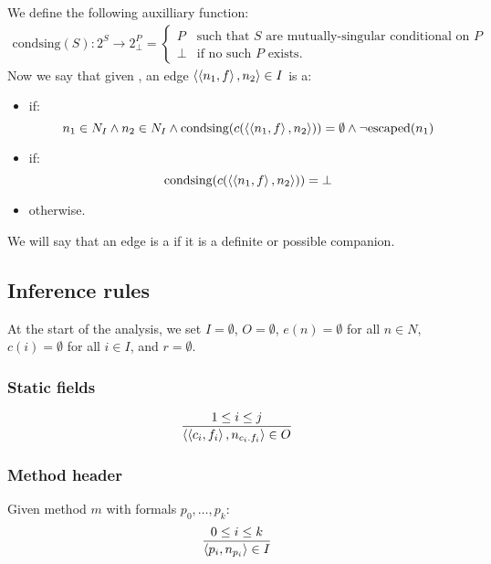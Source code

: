 \documentclass[11pt,notitlepage]{article}
\begin{document}
We define the following auxilliary function:
\begin{multline*}
\text{condsing}(S):2^S\to 2^P_\bot = \begin{cases}
P & \text{such that } S \text{ are mutually-singular conditional on }P \\
\bot & \text{if no such }P\text{ exists.}
\end{cases}
\end{multline*}
Now we say that given ,
an edge $\left\langle \left\langle n_1,f \right\rangle,n_2 \right\rangle \in I$ is a:
\begin{itemize}
\item {} if:
\begin{displaymath}
 n_1\in N_I \wedge n_2\in N_I \wedge
 \text{condsing}(c(\left\langle \left\langle n_1,f \right\rangle,n_2 \right\rangle))=\emptyset \wedge
 \neg\text{escaped}(n_1)
\end{displaymath}
\item {} if:
\begin{displaymath}
 \text{condsing}(c(\left\langle \left\langle n_1,f \right\rangle,n_2 \right\rangle)) = \bot
\end{displaymath}
\item {} otherwise.
\end{itemize}
We will say that an edge is a  if it is a
definite or possible companion.

\subsection{Inference rules}
At the start of the analysis, we set $I=\emptyset$, $O=\emptyset$,
$e(n)=\emptyset$ for all $n\in N$, $c(i)=\emptyset$ for all $i\in I$,
and $r=\emptyset$.

\subsubsection{Static fields}

\begin{displaymath}
\dfrac{1\leq i \leq j}{\left\langle \left\langle c_i,f_i \right\rangle,n_{c_i.f_i} \right\rangle\in O}
\end{displaymath}

\subsubsection{Method header}
Given method $m$ with formals $p_0,\ldots,p_k$:
\begin{displaymath}
\dfrac{0\leq i \leq k}{\left\langle p_i, n_{p_i} \right\rangle\in I}
\end{displaymath}
\end{document}
